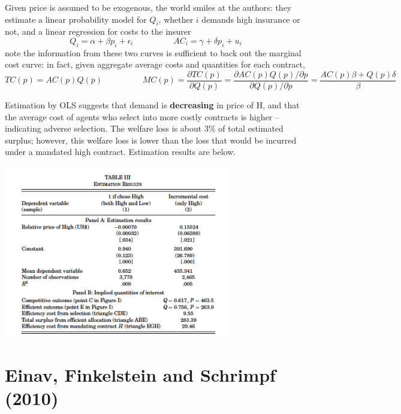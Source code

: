 \documentclass[11pt]{article}
\numberwithin{equation}{section}
\begin{document}
Given price is assumed to be exogenous, the world smiles at the authors: they estimate a linear probability model for $Q_i$, whether $i$ demands high insurance or not, and a linear regression for costs to the insurer
\begin{equation}
	\label{efccrazyeconometrics}
	Q_i = \alpha + \beta p_i + \epsilon_i \hspace{2cm} AC_i = \gamma + \delta p_i + u_i
\end{equation}
note the information from these two curves is sufficient to back out the marginal cost curve: in fact, given aggregate average costs and quantities for each contract,
\begin{equation}
	TC(p) = AC(p)Q(p) \hspace{2cm} MC(p) = \frac{\partial TC(p)}{\partial Q(p)} = \frac{\partial AC(p)Q(p) / \partial p}{\partial Q(p) / \partial p} = \frac{AC(p)\beta + Q(p)\delta}{\beta}
\end{equation}

Estimation by OLS suggests that demand is \textbf{decreasing} in price of H, and that the average cost of agents who select into more costly contracts is higher -- indicating adverse selection. The welfare loss is about 3\% of total estimated surplus; however, this welfare loss is lower than the loss that would be incurred under a mandated high contract. Estimation results are below.

\begin{center}
	\includegraphics[width=0.75\textwidth]{p3}
\end{center}

\section{Einav, Finkelstein and Schrimpf (2010)}
\end{document}

